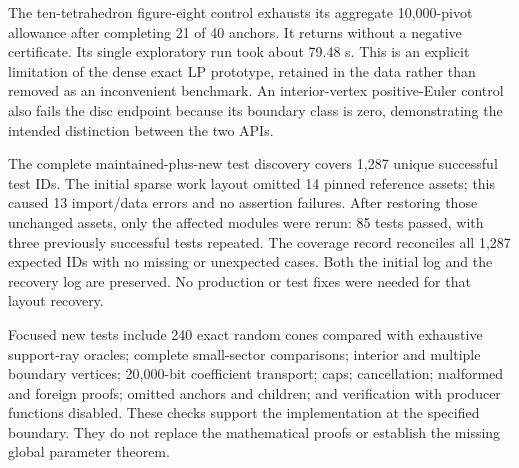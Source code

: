 The ten-tetrahedron figure-eight control exhausts its aggregate 10,000-pivot allowance after completing 21 of 40 anchors. It returns  without a negative certificate. Its single exploratory run took about 79.48 s. This is an explicit limitation of the dense exact LP prototype, retained in the data rather than removed as an inconvenient benchmark. An interior-vertex positive-Euler control also fails the disc endpoint because its boundary class is zero, demonstrating the intended distinction between the two APIs.

The complete maintained-plus-new test discovery covers 1,287 unique successful test IDs. The initial sparse work layout omitted 14 pinned reference assets; this caused 13 import/data errors and no assertion failures. After restoring those unchanged assets, only the affected modules were rerun: 85 tests passed, with three previously successful tests repeated. The coverage record reconciles all 1,287 expected IDs with no missing or unexpected cases. Both the initial log and the recovery log are preserved. No production or test fixes were needed for that layout recovery.

Focused new tests include 240 exact random cones compared with exhaustive support-ray oracles; complete small-sector comparisons; interior and multiple boundary vertices; 20,000-bit coefficient transport; caps; cancellation; malformed and foreign proofs; omitted anchors and children; and verification with producer functions disabled. These checks support the implementation at the specified boundary. They do not replace the mathematical proofs or establish the missing global parameter theorem.
